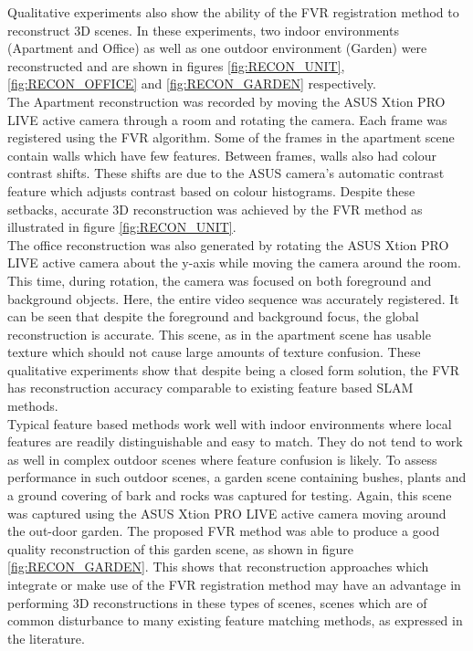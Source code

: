 Qualitative experiments also show the ability of the FVR registration method to reconstruct 3D scenes. In these experiments, two indoor environments (Apartment and Office) as well as one outdoor environment (Garden) were reconstructed and are shown in figures \ref{fig:RECON_UNIT}, \ref{fig:RECON_OFFICE} and \ref{fig:RECON_GARDEN} respectively. \\

The Apartment reconstruction was recorded by moving the ASUS Xtion PRO LIVE active camera through a room and rotating the camera. Each frame was registered using the FVR algorithm. Some of the frames in the apartment scene contain walls which have few features. Between frames, walls also had colour contrast shifts. These shifts are due to the ASUS camera's automatic contrast feature which adjusts contrast based on colour histograms. Despite these setbacks, accurate 3D reconstruction was achieved by the FVR method as illustrated in figure \ref{fig:RECON_UNIT}. \\


The office reconstruction was also generated by rotating the ASUS Xtion PRO LIVE active camera about the y-axis while moving the camera around the room. This time, during rotation, the camera was focused on both foreground and background objects. Here, the entire video sequence was accurately registered. It can be seen that despite the foreground and background focus, the global reconstruction is accurate. This scene, as in the apartment scene has usable texture which should not cause large amounts of texture confusion. These qualitative experiments show that despite being a closed form solution, the FVR has reconstruction accuracy comparable to existing feature based SLAM methods. \\


Typical feature based methods work well with indoor environments where local features are readily distinguishable and easy to match. They do not tend to work as well in complex outdoor scenes where feature confusion is likely. To assess performance in such outdoor scenes, a garden scene containing bushes, plants and a ground covering of bark and rocks was captured for testing. Again, this scene was captured using the ASUS Xtion PRO LIVE active camera moving around the out-door garden. The proposed FVR method was able to produce a good quality reconstruction of this garden scene, as shown in figure \ref{fig:RECON_GARDEN}. This shows that reconstruction approaches which integrate or make use of the FVR registration method may have an advantage in performing 3D reconstructions in these types of scenes, scenes which are of common disturbance to many existing feature matching methods, as expressed in the literature.   

